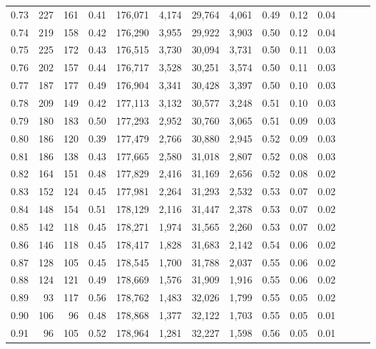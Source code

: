 \begin{tabular}{rrrrrrrrrrrrrr}
0.73 &    227 &  161 &  0.41 &  176,071 &    4,174 &  29,764 &   4,061 &  0.49 &  0.12 &      0.04 \\
0.74 &    219 &  158 &  0.42 &  176,290 &    3,955 &  29,922 &   3,903 &  0.50 &  0.12 &      0.04 \\
0.75 &    225 &  172 &  0.43 &  176,515 &    3,730 &  30,094 &   3,731 &  0.50 &  0.11 &      0.03 \\
0.76 &    202 &  157 &  0.44 &  176,717 &    3,528 &  30,251 &   3,574 &  0.50 &  0.11 &      0.03 \\
0.77 &    187 &  177 &  0.49 &  176,904 &    3,341 &  30,428 &   3,397 &  0.50 &  0.10 &      0.03 \\
0.78 &    209 &  149 &  0.42 &  177,113 &    3,132 &  30,577 &   3,248 &  0.51 &  0.10 &      0.03 \\
0.79 &    180 &  183 &  0.50 &  177,293 &    2,952 &  30,760 &   3,065 &  0.51 &  0.09 &      0.03 \\
0.80 &    186 &  120 &  0.39 &  177,479 &    2,766 &  30,880 &   2,945 &  0.52 &  0.09 &      0.03 \\
0.81 &    186 &  138 &  0.43 &  177,665 &    2,580 &  31,018 &   2,807 &  0.52 &  0.08 &      0.03 \\
0.82 &    164 &  151 &  0.48 &  177,829 &    2,416 &  31,169 &   2,656 &  0.52 &  0.08 &      0.02 \\
0.83 &    152 &  124 &  0.45 &  177,981 &    2,264 &  31,293 &   2,532 &  0.53 &  0.07 &      0.02 \\
0.84 &    148 &  154 &  0.51 &  178,129 &    2,116 &  31,447 &   2,378 &  0.53 &  0.07 &      0.02 \\
0.85 &    142 &  118 &  0.45 &  178,271 &    1,974 &  31,565 &   2,260 &  0.53 &  0.07 &      0.02 \\
0.86 &    146 &  118 &  0.45 &  178,417 &    1,828 &  31,683 &   2,142 &  0.54 &  0.06 &      0.02 \\
0.87 &    128 &  105 &  0.45 &  178,545 &    1,700 &  31,788 &   2,037 &  0.55 &  0.06 &      0.02 \\
0.88 &    124 &  121 &  0.49 &  178,669 &    1,576 &  31,909 &   1,916 &  0.55 &  0.06 &      0.02 \\
0.89 &     93 &  117 &  0.56 &  178,762 &    1,483 &  32,026 &   1,799 &  0.55 &  0.05 &      0.02 \\
0.90 &    106 &   96 &  0.48 &  178,868 &    1,377 &  32,122 &   1,703 &  0.55 &  0.05 &      0.01 \\
0.91 &     96 &  105 &  0.52 &  178,964 &    1,281 &  32,227 &   1,598 &  0.56 &  0.05 &      0.01 \\

\end{tabular}
